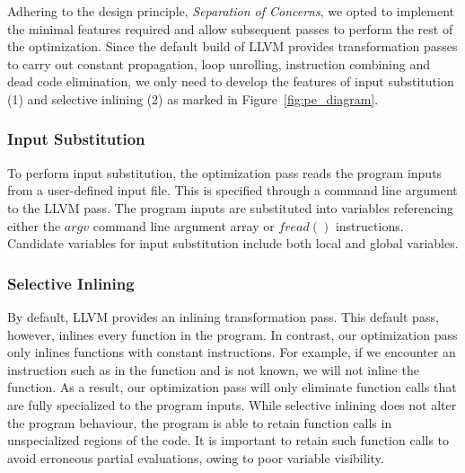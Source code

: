 Adhering to the design principle, \textit{Separation of Concerns}, we opted to implement the minimal features required and allow subsequent passes to perform the rest of the optimization.
Since the default build of LLVM provides transformation passes to carry out constant propagation, loop unrolling, instruction combining and dead code elimination, we only need to develop the features of input substitution (1) and selective inlining (2) as marked in Figure~\ref{fig:pe_diagram}.

\bigbreak
\subsubsection{Input Substitution}

To perform input substitution, the optimization pass reads the program inputs from a user-defined input file. 
This is specified through a command line argument to the LLVM pass. 
The program inputs are substituted into variables referencing either the $argv$ command line argument array or $fread()$ instructions.
Candidate variables for input substitution include both local and global variables.

\bigbreak
\subsubsection{Selective Inlining}

By default, LLVM provides an inlining transformation pass.
This default pass, however, inlines every function in the program.
In contrast, our optimization pass only inlines functions with constant instructions.
For example, if we encounter an instruction such as  in the function and  is not known, we will not inline the function.
As a result, our optimization pass will only eliminate function calls that are fully specialized to the program inputs.
While selective inlining does not alter the program behaviour, the program is able to retain function calls in unspecialized regions of the code.
It is important to retain such function calls to avoid erroneous partial evaluations, owing to poor variable visibility.
